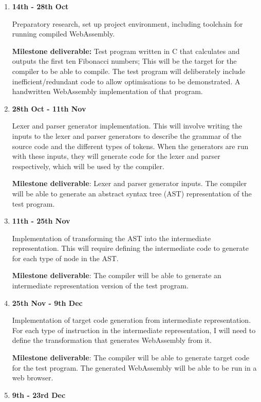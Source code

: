 \documentclass[12pt,a4paper]{article}
\begin{document}
\begin{enumerate}

\item \textbf{14th - 28th Oct}

  Preparatory research, set up project environment, including toolchain for running compiled WebAssembly.

  \textbf{Milestone deliverable:} Test program written in C that calculates and outputs the first ten Fibonacci numbers; This will be the target for the compiler to be able to compile. The test program will deliberately include inefficient/redundant code to allow optimisations to be demonstrated. A handwritten WebAssembly implementation of that program.

\item\textbf{28th Oct - 11th Nov}

  Lexer and parser generator implementation.
  This will involve writing the inputs to the lexer and parser generators to describe the grammar of the source code and the different types of tokens.
  When the generators are run with these inputs, they will generate code for the lexer and parser respectively, which will be used by the compiler.

  \textbf{Milestone deliverable}: Lexer and parser generator inputs. The compiler will be able to generate an abstract syntax tree (AST) representation of the test program.

\item\textbf{11th - 25th Nov}

  Implementation of transforming the AST into the intermediate representation.
  This will require defining the intermediate code to generate for each type of node in the AST.

  \textbf{Milestone deliverable}: The compiler will be able to generate an intermediate representation version of the test program.

\item\textbf{25th Nov - 9th Dec}

  Implementation of target code generation from intermediate representation.
  For each type of instruction in the intermediate representation, I will need to define the transformation that generates WebAssembly from it.

  \textbf{Milestone deliverable}: The compiler will be able to generate target code for the test program. The generated WebAssembly will be able to be run in a web browser.

\item\textbf{9th - 23rd Dec}


\end{enumerate}
\end{document}
